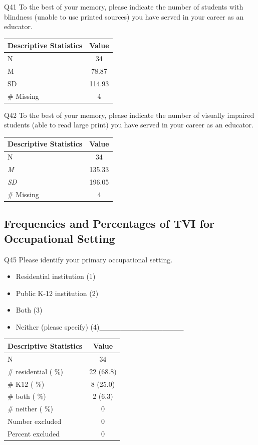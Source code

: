 \documentclass[11.5pt]{sig-alternate} %
\begin{document}
\begin{large}
Q41 To the best of your memory, please indicate the number of students with blindness (unable to use printed sources) you have served in your career as an educator. 
\begin{table}[h]
\centering
\begin{tabular}{lc}
Descriptive Statistics & Value\\ \hline
N  & 34 \\
M &	78.87\\
SD	& 114.93\\
\# Missing & 4\\
\end{tabular}
\end{table}

Q42 To the best of your memory, please indicate the number of visually impaired students (able to read large print) you have served in your career as an educator. 
\begin{table}[h]
\centering
\begin{tabular}{lc}
Descriptive Statistics & Value\\ \hline
N  & 34 \\
\textit{M} &	135.33\\
\textit{SD}	& 196.05\\
\# Missing &	4\\
\end{tabular}
\end{table}

\subsection*{Frequencies and Percentages of TVI for Occupational Setting}
Q45 Please identify your primary occupational setting. 
\begin{itemize}
    \item Residential institution (1)
    \item Public K-12 institution (2)
    \item Both (3)
    \item Neither (please specify) (4)\_\_\_\_\_\_\_\_\_\_\_\_\_\_\_\_
\end{itemize}

\begin{table}[h]
\centering
\begin{tabular}{lc}
Descriptive Statistics & Value\\ \hline
N  & 34 \\
\# residential ( \%)	& 22 (68.8)\\
\# K12 ( \%) &	8 (25.0)\\
\# both ( \%)&	2 (6.3)\\
\# neither ( \%) &	0\\
Number excluded &	0\\
Percent excluded &	0\\
\end{tabular}
\end{table}


\end{large}
\end{document}
